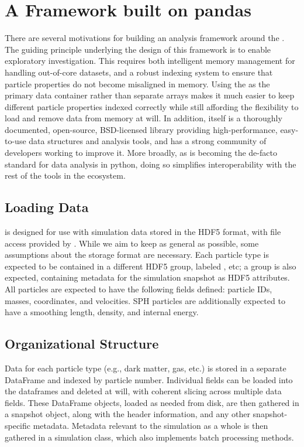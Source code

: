 \section{A Framework built on pandas}
\label{framework}

There are several motivations for building an analysis framework around the . 
The guiding principle underlying the design of this framework is to enable exploratory investigation.
This requires both intelligent memory management for handling out-of-core datasets, and a robust indexing system to ensure that particle properties do not become misaligned in memory.
Using  the  as the primary data container rather than separate  arrays makes it much easier to keep different particle properties indexed correctly while still affording the flexibility to load and remove data from memory at will.
In addition,  itself is a thoroughly documented, open-source, BSD-licensed library providing high-performance, easy-to-use data structures and analysis tools, and has a strong community of developers working to improve it.  
More broadly, as  is becoming the de-facto standard for data analysis in python, doing so simplifies interoperability with the rest of the tools in the ecosystem.


\subsection{Loading Data}
\label{interface}
 is designed for use with simulation data stored in the HDF5 format, with file access provided by .  
While we aim to keep  as general as possible, some assumptions about the storage format are necessary.
Each particle type is expected to be contained in a different HDF5 group, labeled , etc; a  group is also expected, containing metadata for the simulation snapshot as HDF5 attributes. 
All particles are expected to have the following fields defined: particle IDs, masses, coordinates, and velocities.  
SPH particles are additionally expected to have a smoothing length, density, and internal energy.  

\subsection{Organizational Structure}
\label{hierarchy}

Data for each particle type (e.g., dark matter, gas, etc.) is stored in a separate DataFrame and indexed by particle number.  Individual fields can be loaded into the dataframes and deleted at will, with coherent slicing across multiple data fields.   These DataFrame objects, loaded as needed from disk, are then gathered in a snapshot object, along with the header information, and any other snapshot-specific metadata.  Metadata relevant to the simulation as a whole is then gathered in a simulation class, which also implements batch processing methods.

